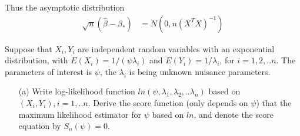 \documentclass[11pt]{article} %
\begin{document}
Thus the asymptotic distribution
\begin{align*}
	\sqrt{n} (\hat{\beta} - \beta_{\ast}) &=N(0, n(X^T X)^{-1}) 
\end{align*}

Suppose that $X_i, Y_i$ are independent random variables with an exponential distribution, with $E(X_i)= 1/(\psi \lambda_i)$ and $E(Y_i) = 1/\lambda_i$, for $i=1,2,..n$. The parameters of interest is $\psi$, the $\lambda_i$ is being unknown nuisance parameters.

\begin{itemize}
	\item [(a)] Write log-likelihood function $ln(\psi, \lambda_1, \lambda_2, ..\lambda_n)$ based on $(X_i, Y_i), i=1,..n$. Derive the score function (only depends on $\psi$) that the maximum likelihood estimator for $\psi$ based on $ln$, and denote the score equation by $S_n(\psi) = 0$.
	
\end{itemize}
  
\end{document}
